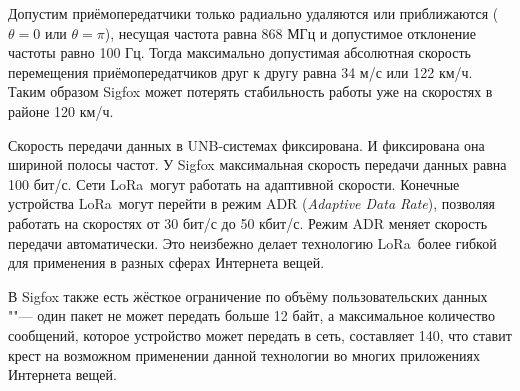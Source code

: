 Допустим приёмопередатчики только радиально удаляются или приближаются ($\theta = 0$ 
или $\theta = \pi$), несущая частота равна 868 МГц и допустимое отклонение 
частоты равно 100 Гц. 
Тогда максимально допустимая абсолютная скорость перемещения 
приёмопередатчиков друг к другу равна 34 м/с или 122 км/ч. 
Таким образом Sigfox может потерять стабильность работы уже на скоростях в районе 120 км/ч.

Скорость передачи данных в UNB-системах фиксирована. И фиксирована она шириной 
полосы частот.
У Sigfox максимальная скорость передачи данных равна 100 бит/с.
Сети LoRa\texttrademark~могут работать на адаптивной скорости. 
Конечные устройства LoRa\texttrademark~могут перейти в режим ADR 
(\textit{Adaptive Data 
Rate}), позволяя работать на скоростях от 30 бит/с до 50 кбит/с.
Режим ADR меняет скорость передачи автоматически.
Это неизбежно делает технологию LoRa\texttrademark~более гибкой для применения 
в разных сферах Интернета вещей.

В Sigfox также есть жёсткое ограничение по объёму пользовательских данных ""--- 
один пакет не может передать больше 12 байт, а максимальное количество 
сообщений, которое устройство может передать в сеть, составляет 140, что ставит 
крест на возможном применении данной технологии во многих приложениях Интернета 
вещей.







